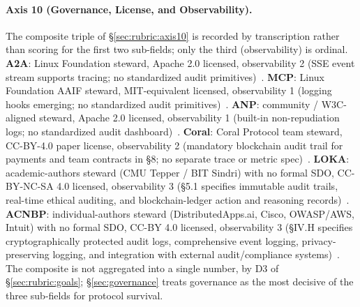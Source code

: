 \paragraph{Axis 10 (Governance, License, and Observability).}
The composite triple of \S\ref{sec:rubric:axis10} is
recorded by transcription rather than scoring for the
first two sub-fields; only the third (observability) is
ordinal. \textbf{A2A}: Linux Foundation steward, Apache
2.0 licensed, observability 2 (SSE event stream supports
tracing; no standardized audit
primitives)~\cite{spec_a2a, lf_aaif}. \textbf{MCP}:
Linux Foundation AAIF steward, MIT-equivalent licensed,
observability 1 (logging hooks emerging; no standardized
audit primitives)~\cite{spec_mcp, lf_aaif}.
\textbf{ANP}: community / W3C-aligned steward, Apache
2.0 licensed, observability 1 (built-in non-repudiation
logs; no standardized audit dashboard)~\cite{spec_anp,
w3c_agent_protocol_cg}. \textbf{Coral}: Coral Protocol
team steward, CC-BY-4.0 paper license, observability 2
(mandatory blockchain audit trail for payments and team
contracts in \S8; no separate trace or metric
spec)~\cite{spec_coral}. \textbf{LOKA}: academic-authors
steward (CMU Tepper / BIT Sindri) with no formal SDO,
CC-BY-NC-SA 4.0 licensed, observability 3 (\S5.1
specifies immutable audit trails, real-time ethical
auditing, and blockchain-ledger action and reasoning
records)~\cite{spec_loka}. \textbf{ACNBP}:
individual-authors steward (DistributedApps.ai, Cisco,
OWASP/AWS, Intuit) with no formal SDO, CC-BY 4.0
licensed, observability 3 (\S IV.H specifies
cryptographically protected audit logs, comprehensive
event logging, privacy-preserving logging, and
integration with external audit/compliance
systems)~\cite{spec_acnbp}. The composite is not
aggregated into a single number, by D3 of
\S\ref{sec:rubric:goals}; \S\ref{sec:governance} treats
governance as the most decisive of the three sub-fields
for protocol survival.

